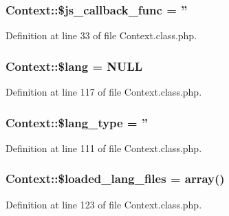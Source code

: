 \hypertarget{classContext_afddd5e6374a20b88466dfd1cb6f32d62}{
\subsubsection[{\$js\-\_\-callback\-\_\-func}]{\setlength{\rightskip}{0pt plus 5cm}Context\-::\$js\-\_\-callback\-\_\-func = ''}}\label{classContext_afddd5e6374a20b88466dfd1cb6f32d62}


Definition at line 33 of file Context.\-class.\-php.

\hypertarget{classContext_a0771720dad655d0c53f6f31066c67a40}{
\subsubsection[{\$lang}]{\setlength{\rightskip}{0pt plus 5cm}Context\-::\$lang = N\-U\-L\-L}}\label{classContext_a0771720dad655d0c53f6f31066c67a40}


Definition at line 117 of file Context.\-class.\-php.

\hypertarget{classContext_a170ac1b95c16b53af329395df9376e9f}{
\subsubsection[{\$lang\-\_\-type}]{\setlength{\rightskip}{0pt plus 5cm}Context\-::\$lang\-\_\-type = ''}}\label{classContext_a170ac1b95c16b53af329395df9376e9f}


Definition at line 111 of file Context.\-class.\-php.

\hypertarget{classContext_a0a199fec60b92b21746f1b6e93df01dc}{
\subsubsection[{\$loaded\-\_\-lang\-\_\-files}]{\setlength{\rightskip}{0pt plus 5cm}Context\-::\$loaded\-\_\-lang\-\_\-files = array()}}\label{classContext_a0a199fec60b92b21746f1b6e93df01dc}


Definition at line 123 of file Context.\-class.\-php.

